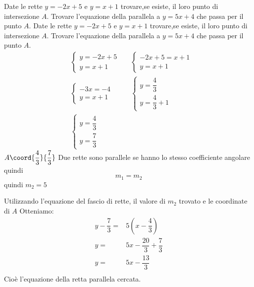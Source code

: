 \begin{exercise}
	Date le rette $y=-2x+5$ e $y=x+1$ trovare,se esiste, il loro punto di intersezione $A$. Trovare l'equazione della parallela a $y=5x+4$ che passa per il punto $A$.
	\tcblower
	Date le rette $y=-2x+5$ e $y=x+1$ trovare,se esiste, il loro punto di intersezione $A$. Trovare l'equazione della parallela a $y=5x+4$ che passa per il punto $A$.
	\begin{align*}
		&\begin{cases}
			y=-2x+5\\
			y=x+1
		\end{cases}
		&&\begin{cases}
			-2x+5=x+1\\
			y=x+1
		\end{cases}\\
		&\begin{cases}
			-3x=-4\\
			y=x+1
		\end{cases}
		&&\begin{cases}
			y=\dfrac{4}{3}\\[.5em]
			y=\dfrac{4}{3}+1
		\end{cases}\\
		&\begin{cases}
			y=\dfrac{4}{3}\\[.5em]
			y=\dfrac{7}{3}
		\end{cases}
	\end{align*}
	$A\coord{\dfrac{4}{3}}{\dfrac{7}{3}}$
	Due rette sono parallele se hanno lo stesso coefficiente angolare quindi \[m_1=m_2 \]
	quindi $m_2=5$
	
	Utilizzando l'equazione del fascio di rette, il valore di $m_2$ trovato e le coordinate di $A$ Otteniamo:
	\begin{align*}
		y-\dfrac{7}{3}=&5(x-\dfrac{4}{3})\\
		y=&5x-\dfrac{20}{3}+\dfrac{7}{3}\\
		y=&5x-\dfrac{13}{3}\\
	\end{align*}
	Cioè l'equazione della retta parallela cercata.
	\begin{center}
		
	\end{center}
	
\end{exercise}